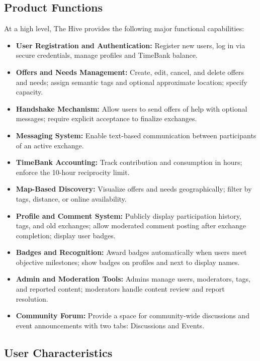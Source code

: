 \documentclass[11pt,a4paper]{report}
\begin{document}
\subsection{Product Functions}

At a high level, The Hive provides the following major functional capabilities:

\begin{itemize}
    \item \textbf{User Registration and Authentication:} Register new users, log in via secure credentials, manage profiles and TimeBank balance.
    \item \textbf{Offers and Needs Management:} Create, edit, cancel, and delete offers and needs; assign semantic tags and optional approximate location; specify capacity.
    \item \textbf{Handshake Mechanism:} Allow users to send offers of help with optional messages; require explicit acceptance to finalize exchanges.
    \item \textbf{Messaging System:} Enable text-based communication between participants of an active exchange.
    \item \textbf{TimeBank Accounting:} Track contribution and consumption in hours; enforce the 10-hour reciprocity limit.
    \item \textbf{Map-Based Discovery:} Visualize offers and needs geographically; filter by tags, distance, or online availability.
    \item \textbf{Profile and Comment System:} Publicly display participation history, tags, and old exchanges; allow moderated comment posting after exchange completion; display user badges.
    \item \textbf{Badges and Recognition:} Award badges automatically when users meet objective milestones; show badges on profiles and next to display names.
    \item \textbf{Admin and Moderation Tools:} Admins manage users, moderators, tags, and reported content; moderators handle content review and report resolution.
    \item \textbf{Community Forum:} Provide a space for community-wide discussions and event announcements with two tabs: Discussions and Events.
\end{itemize}

\subsection{User Characteristics}
\end{document}
